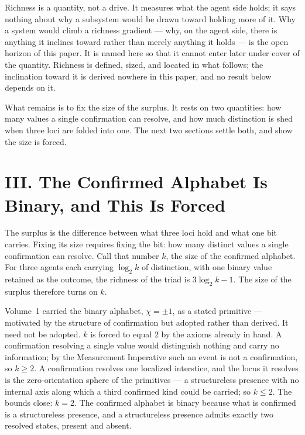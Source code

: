 \documentclass[11pt,oneside]{report}
\theoremstyle{definition}
\theoremstyle{remark}
\begin{document}
Richness is a quantity, not a drive. It measures what the agent side holds; it says nothing
about why a subsystem would be drawn toward holding more of it. Why a system would climb a
richness gradient --- why, on the agent side, there is anything it inclines toward rather than
merely anything it holds --- is the open horizon of this paper. It is named here so that it
cannot enter later under cover of the quantity. Richness is defined, sized, and located in what
follows; the inclination toward it is derived nowhere in this paper, and no result below depends
on it.

What remains is to fix the size of the surplus. It rests on two quantities: how many values a
single confirmation can resolve, and how much distinction is shed when three loci are folded
into one. The next two sections settle both, and show the size is forced.

\section*{III. The Confirmed Alphabet Is Binary, and This Is Forced}

The surplus is the difference between what three loci hold and what one bit carries. Fixing its
size requires fixing the bit: how many distinct values a single confirmation can resolve. Call
that number \ensuremath{k}, the size of the confirmed alphabet. For three agents each carrying
\ensuremath{\log_2 k} of distinction, with one binary value retained as the outcome, the richness
of the triad is \ensuremath{3\log_2 k - 1}. The size of the surplus therefore turns on
\ensuremath{k}.

Volume~1 carried the binary alphabet, \ensuremath{\chi = \pm 1}, as a stated primitive ---
motivated by the structure of confirmation but adopted rather than derived. It need not be
adopted. \ensuremath{k} is forced to equal \ensuremath{2} by the axioms already in hand. A
confirmation resolving a single value would distinguish nothing and carry no information; by the
Measurement Imperative such an event is not a confirmation, so \ensuremath{k \geq 2}. A
confirmation resolves one localized interstice, and the locus it resolves is the zero-orientation
sphere of the primitives --- a structureless presence with no internal axis along which a third
confirmed kind could be carried; so \ensuremath{k \leq 2}. The bounds close:
\ensuremath{k = 2}. The confirmed alphabet is binary because what is confirmed is a structureless
presence, and a structureless presence admits exactly two resolved states, present and absent.
\end{document}
